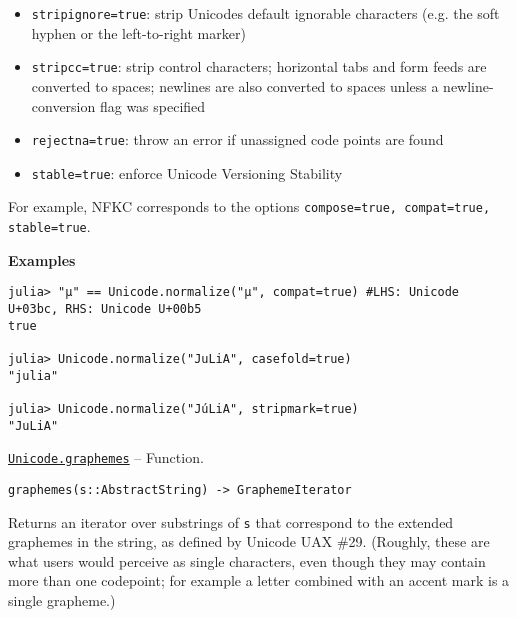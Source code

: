 \begin{adjustwidth}{2em}{0pt}
\begin{itemize}
\item \texttt{stripignore=true}: strip Unicode{\textquotesingle}s {\textquotedbl}default ignorable{\textquotedbl} characters (e.g. the soft hyphen or the left-to-right marker)


\item \texttt{stripcc=true}: strip control characters; horizontal tabs and form feeds are converted to spaces; newlines are also converted to spaces unless a newline-conversion flag was specified


\item \texttt{rejectna=true}: throw an error if unassigned code points are found


\item \texttt{stable=true}: enforce Unicode Versioning Stability

\end{itemize}
For example, NFKC corresponds to the options \texttt{compose=true, compat=true, stable=true}.

\textbf{Examples}


\begin{verbatim}
julia> "μ" == Unicode.normalize("µ", compat=true) #LHS: Unicode U+03bc, RHS: Unicode U+00b5
true

julia> Unicode.normalize("JuLiA", casefold=true)
"julia"

julia> Unicode.normalize("JúLiA", stripmark=true)
"JuLiA"
\end{verbatim}



\end{adjustwidth}
\hypertarget{15282403158595139101}{} 
\hyperlink{15282403158595139101}{\texttt{Unicode.graphemes}}  -- {Function.}

\begin{adjustwidth}{2em}{0pt}


\begin{verbatim}
graphemes(s::AbstractString) -> GraphemeIterator
\end{verbatim}

Returns an iterator over substrings of \texttt{s} that correspond to the extended graphemes in the string, as defined by Unicode UAX \#29. (Roughly, these are what users would perceive as single characters, even though they may contain more than one codepoint; for example a letter combined with an accent mark is a single grapheme.)



\end{adjustwidth}
